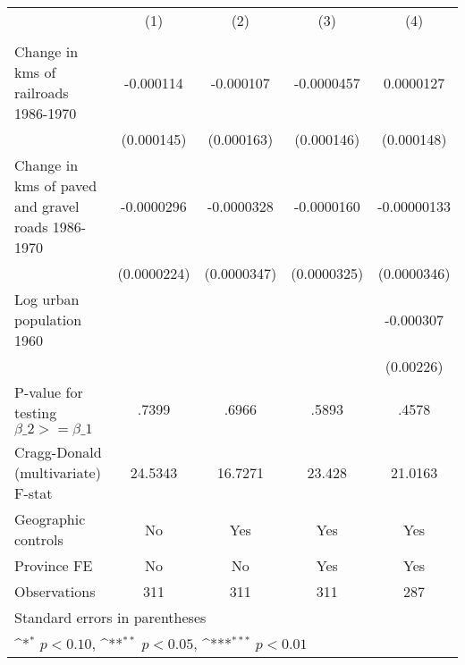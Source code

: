 {
\def\sym#1{\ifmmode^{#1}\else\(^{#1}\)\fi}
\begin{tabular}{l*{4}{c}}
\hline\hline
                &\multicolumn{1}{c}{(1)}&\multicolumn{1}{c}{(2)}&\multicolumn{1}{c}{(3)}&\multicolumn{1}{c}{(4)}\\
                &\multicolumn{1}{c}{}&\multicolumn{1}{c}{}&\multicolumn{1}{c}{}&\multicolumn{1}{c}{}\\
\hline
Change in kms of railroads 1986-1970&-0.000114         &-0.000107         &-0.0000457         &0.0000127         \\
                &(0.000145)         &(0.000163)         &(0.000146)         &(0.000148)         \\
[1em]
Change in kms of paved and gravel roads 1986-1970&-0.0000296         &-0.0000328         &-0.0000160         &-0.00000133         \\
                &(0.0000224)         &(0.0000347)         &(0.0000325)         &(0.0000346)         \\
[1em]
Log urban population 1960&                  &                  &                  &-0.000307         \\
                &                  &                  &                  &(0.00226)         \\
\hline
P-value for testing $\beta\_{2} >= \beta\_{1}$&    .7399         &    .6966         &    .5893         &    .4578         \\
Cragg-Donald (multivariate) F-stat&  24.5343         &  16.7271         &   23.428         &  21.0163         \\
Geographic controls&       No         &      Yes         &      Yes         &      Yes         \\
Province FE     &       No         &       No         &      Yes         &      Yes         \\
Observations    &      311         &      311         &      311         &      287         \\
\hline\hline
\multicolumn{5}{l}{\footnotesize Standard errors in parentheses}\\
\multicolumn{5}{l}{\footnotesize \sym{*} \(p<0.10\), \sym{**} \(p<0.05\), \sym{***} \(p<0.01\)}\\
\end{tabular}
}
